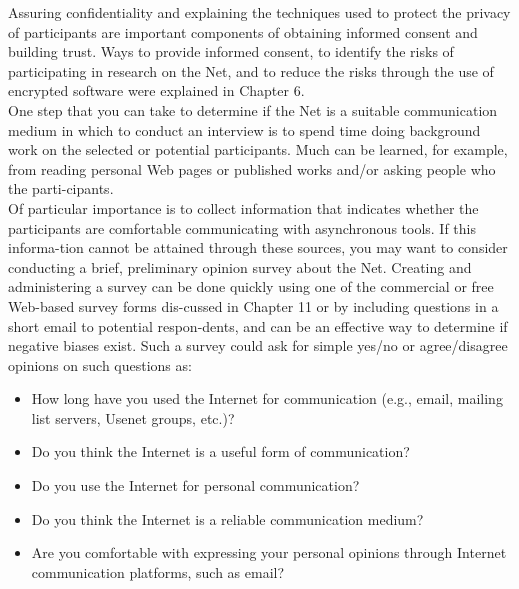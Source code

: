 \documentclass[,a49pt]{book}
\begin{document}
 Assuring confidentiality and explaining the techniques used to protect the privacy of participants are important components of obtaining informed consent and building trust. Ways to provide informed consent, to identify the risks of participating in research on the Net, and to reduce the risks through the use of encrypted software were explained in Chapter 6.\\
 \hspace*{0.5cm} One step that you can take to determine if the Net is a suitable communication medium in which to conduct an interview is to spend time doing background work on the selected or potential participants. Much can be learned, for example, from reading personal Web pages or published works and/or asking people who the parti-cipants.\\

  Of particular importance is to collect information that indicates whether the participants are comfortable communicating with asynchronous tools.
If this informa-tion cannot be attained through these sources, you may want to consider conducting a brief, preliminary opinion survey about the Net. Creating and administering a survey can be done quickly using one of the commercial or free Web-based survey forms dis-cussed in Chapter 11 or by including questions in a short email to potential respon-dents, and can be an effective way to determine if negative biases exist. Such a survey could ask for simple yes/no or agree/disagree opinions on such questions as:\\

\vspace*{0.2cm}

\begin{itemize}
  \item How long have you used the Internet for communication (e.g., email, mailing list servers, Usenet groups, etc.)?\\
  \item Do you think the Internet is a useful form of communication?\\
  \item Do you use the Internet for personal communication?\\
  \item Do you think the Internet is a reliable communication medium?\\
  \item Are you comfortable with expressing your personal opinions through Internet communication platforms, such as email?\\
\end{itemize}
\end{document}
